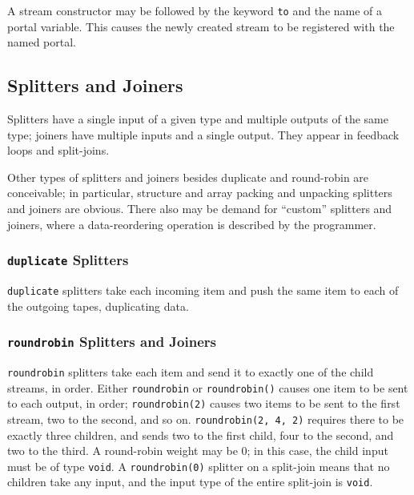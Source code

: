 \documentclass[11pt]{article}
\begin{document}
A stream constructor may be followed by the keyword \lstinline|to| and
the name of a portal variable.  This causes the newly created stream
to be registered with the named portal.

\subsection{Splitters and Joiners}
\label{sec:expr-splitters-joiners}

Splitters have a single input of a given type and multiple outputs of
the same type; joiners have multiple inputs and a single output.  They
appear in feedback loops and split-joins.

\begin{note}
  Other types of splitters and joiners besides duplicate and
  round-robin are conceivable; in particular, structure and array
  packing and unpacking splitters and joiners are obvious.  There also
  may be demand for ``custom'' splitters and joiners, where a
  data-reordering operation is described by the programmer.
\end{note}

\subsubsection{\lstinline|duplicate| Splitters}
\label{sec:expr-duplicate}

\lstinline|duplicate| splitters take each incoming item and push the
same item to each of the outgoing tapes, duplicating data.

\subsubsection{\lstinline|roundrobin| Splitters and Joiners}
\label{sec:expr-round-robin}

\lstinline|roundrobin| splitters take each item and send it to exactly
one of the child streams, in order.  Either \lstinline|roundrobin| or
\lstinline|roundrobin()| causes one item to be sent to each output, in
order; \lstinline|roundrobin(2)| causes two items to be sent to the first
stream, two to the second, and so on.  \lstinline|roundrobin(2, 4, 2)|
requires there to be exactly three children, and sends two to the
first child, four to the second, and two to the third.  A round-robin
weight may be 0; in this case, the child input must be of type
\lstinline|void|.  A \lstinline|roundrobin(0)| splitter on a
split-join means that no children take any input, and the input type
of the entire split-join is \lstinline|void|.
\end{document}
